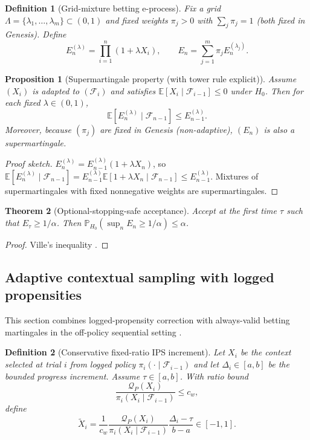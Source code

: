 \documentclass[11pt,a4paper]{article}
\newtheorem{theorem}{Theorem}[section]
\newtheorem{proposition}[theorem]{Proposition}
\newtheorem{definition}{Definition}[section]
\begin{document}
\begin{definition}[Grid-mixture betting e-process]
Fix a grid $\Lambda=\{\lambda_1,\dots,\lambda_m\}\subset(0,1)$ and fixed weights $\pi_j>0$ with $\sum_j\pi_j=1$ (both fixed in Genesis).
Define
\[
E_n^{(\lambda)}=\prod_{i=1}^n (1+\lambda X_i),
\qquad
E_n=\sum_{j=1}^m \pi_j E_n^{(\lambda_j)}.
\]
\end{definition}

\begin{proposition}[Supermartingale property (with tower rule explicit)]
Assume $(X_i)$ is adapted to $(\mathcal{F}_i)$ and satisfies $\mathbb{E}[X_i\mid \mathcal{F}_{i-1}]\le 0$ under $H_0$.
Then for each fixed $\lambda\in(0,1)$,
\[
\mathbb{E}[E_n^{(\lambda)}\mid \mathcal{F}_{n-1}] \le E_{n-1}^{(\lambda)}.
\]
Moreover, because $(\pi_j)$ are fixed in Genesis (non-adaptive), $(E_n)$ is also a supermartingale.
\end{proposition}
\begin{proof}[Proof sketch]
$E_n^{(\lambda)}=E_{n-1}^{(\lambda)}(1+\lambda X_n)$, so
$\mathbb{E}[E_n^{(\lambda)}\mid \mathcal{F}_{n-1}]=E_{n-1}^{(\lambda)}\mathbb{E}[1+\lambda X_n\mid \mathcal{F}_{n-1}]\le E_{n-1}^{(\lambda)}$.
Mixtures of supermartingales with fixed nonnegative weights are supermartingales.
\end{proof}

\begin{theorem}[Optional-stopping-safe acceptance]
\label{thm:optional}
Accept at the first time $\tau$ such that $E_\tau\ge 1/\alpha$.
Then $\mathbb{P}_{H_0}(\sup_n E_n\ge 1/\alpha)\le \alpha$.
\end{theorem}
\begin{proof}
Ville's inequality \citep{Howard2021CS,Shafer2021Betting,Grunwald2024SafeTesting}.
\end{proof}

\subsection{Adaptive contextual sampling with logged propensities}
This section combines logged-propensity correction with always-valid betting martingales in the off-policy sequential setting \citep{Karampatziakis2021OffPolicyCS,WaudbySmithRamdas2024Betting}.
\begin{definition}[Conservative fixed-ratio IPS increment]
Let $X_i$ be the context selected at trial $i$ from logged policy $\pi_i(\cdot\mid\mathcal{F}_{i-1})$ and let $\Delta_i\in[a,b]$ be the bounded progress increment.
Assume $\tau\in[a,b]$.
With ratio bound
\[
\frac{\mathcal{Q}_P(X_i)}{\pi_i(X_i\mid\mathcal{F}_{i-1})}\le c_w,
\]
define
\[
\widetilde X_i
=
\frac{1}{c_w}
\frac{\mathcal{Q}_P(X_i)}{\pi_i(X_i\mid\mathcal{F}_{i-1})}
\frac{\Delta_i-\tau}{b-a}
\in[-1,1].
\]
\end{definition}
\end{document}

